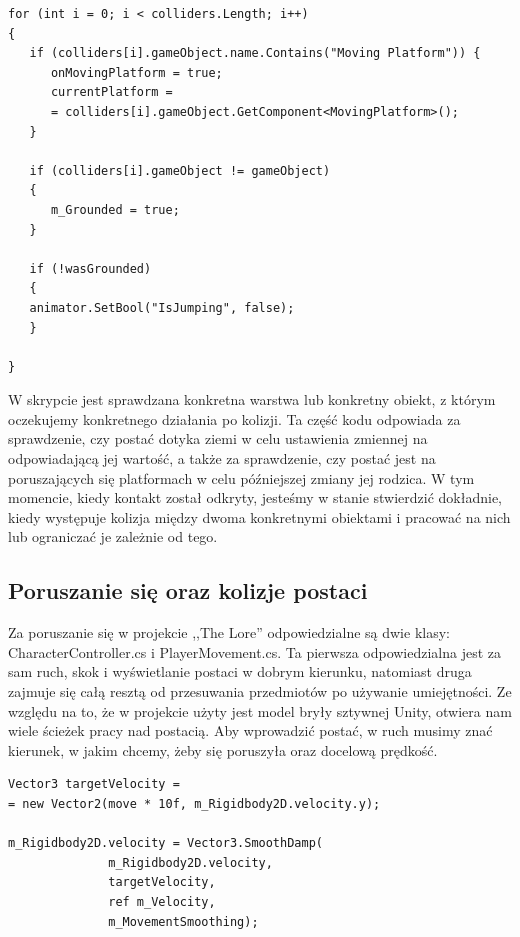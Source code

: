 \documentclass[oneside,polski,logo]{amuthesis}
\begin{document}
\begin{lstlisting}[breaklines=true,
language={[Sharp]C},
rulecolor=\color{blue!80!black},
caption={Fragment klasy \texttt{CharacterController.cs}}
]
for (int i = 0; i < colliders.Length; i++)
{
   if (colliders[i].gameObject.name.Contains("Moving Platform")) {
      onMovingPlatform = true;
      currentPlatform = 
      = colliders[i].gameObject.GetComponent<MovingPlatform>();
   }

   if (colliders[i].gameObject != gameObject)
   {
      m_Grounded = true;
   }

   if (!wasGrounded)
   {
   animator.SetBool("IsJumping", false);
   }

}
\end{lstlisting}

W skrypcie jest sprawdzana konkretna warstwa lub konkretny obiekt, z którym oczekujemy konkretnego działania po kolizji.
Ta część kodu odpowiada za sprawdzenie, czy postać dotyka ziemi w celu ustawienia zmiennej na odpowiadającą jej wartość, a także za sprawdzenie, czy postać jest na poruszających się platformach w celu późniejszej zmiany jej rodzica.
W tym momencie, kiedy kontakt został odkryty, jesteśmy w stanie stwierdzić dokładnie, kiedy występuje kolizja między dwoma konkretnymi obiektami i pracować na nich lub ograniczać je zależnie od tego.

\subsection{Poruszanie się oraz kolizje postaci}
Za poruszanie się w projekcie ,,The Lore'' odpowiedzialne są dwie klasy: CharacterController.cs i PlayerMovement.cs. Ta pierwsza odpowiedzialna jest za sam ruch, skok i wyświetlanie postaci w dobrym kierunku, natomiast druga zajmuje się całą resztą od przesuwania przedmiotów po używanie umiejętności. Ze względu na to, że w projekcie użyty jest model bryły sztywnej Unity, otwiera nam wiele ścieżek pracy nad postacią. Aby wprowadzić postać, w ruch musimy znać kierunek, w jakim chcemy, żeby się poruszyła oraz docelową prędkość.


\begin{lstlisting}[breaklines=true,
language={[Sharp]C},
rulecolor=\color{blue!80!black},
caption={Fragment klasy \texttt{CharacterController.cs}}
]
Vector3 targetVelocity =
= new Vector2(move * 10f, m_Rigidbody2D.velocity.y);

m_Rigidbody2D.velocity = Vector3.SmoothDamp(
              m_Rigidbody2D.velocity, 
              targetVelocity, 
              ref m_Velocity, 
              m_MovementSmoothing);
\end{lstlisting}
\end{document}
